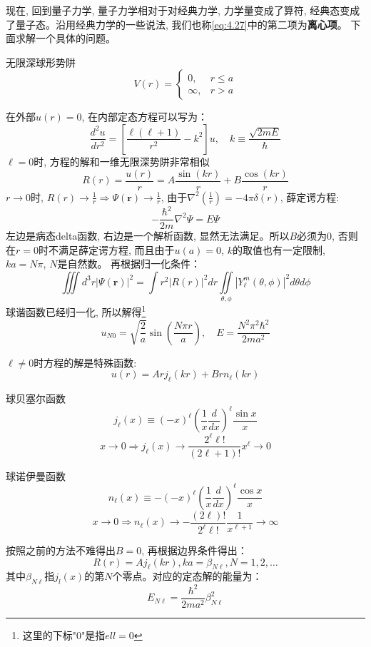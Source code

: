 \documentclass[a4paper,zihao=-4,linespread=1]{ctexrep}
\begin{document}
    现在, 回到量子力学, 量子力学相对于对经典力学, 力学量变成了算符, 经典态变成了量子态。沿用经典力学的一些说法, 我们也称\ref{eq:4.27}中的第二项为\textbf{离心项}。
    下面求解一个具体的问题。
    \begin{define}{无限深球形势阱}
        \begin{equation}
          V(r)=\begin{cases}
            0,&r\leq a\\
            \infty,&r>a
            \end{cases}  
        \end{equation}
    \end{define}
    在外部$u(r)=0$, 在内部定态方程可以写为：
    \begin{equation}
        \frac{d^2u}{dr^2}=\left[\frac{\ell\left(\ell+1\right)}{r^2}-k^2\right]u,\quad k\equiv\frac{\sqrt{2mE}}{\hbar}
    \end{equation}
    $\ell=0$时, 方程的解和一维无限深势阱非常相似
    \[R(r)=\frac{u(r)}{r}=A\frac{\sin(kr)}{r}+B\frac{\cos(kr)}{r}\]
    $r\to0$时, $R(r)\to \frac{1}{r}\Rightarrow \Psi(\bm{r})\to \frac{1}{r}$, 由于$\nabla^2\left(\frac{1}{r}\right)=-4\pi\delta(r)$, 薛定谔方程:
    \[-\frac{\hbar^2}{2m}\nabla^2\Psi=E\Psi\]
    左边是病态delta函数, 右边是一个解析函数, 显然无法满足。所以$B$必须为$0$, 否则在$r=0$时不满足薛定谔方程, 而且由于$u(a)=0$, $k$的取值也有一定限制, $ka=N\pi$, $N$是自然数。
    再根据归一化条件：\[
        \iiint d^3r\left|\Psi(\bm{r})\right|^2=\int r^2\left|R(r)\right|^2dr\iint\limits_{\theta,\phi}\left|Y_\ell^m(\theta,\phi)\right|^2d\theta d\phi\]
    球谐函数已经归一化, 所以解得\footnote{这里的下标"0"是指$ell=0$}
    \begin{equation}
        u_{N0}=\sqrt{\frac{2}{a}}\sin\left(\frac{N\pi r}{a}\right),\quad E=\frac{N^2\pi^2\hbar^2}{2ma^2}
    \end{equation}

    $\ell\neq 0$时方程的解是特殊函数:
    \[u(r)=Arj_\ell(kr)+Brn_\ell(kr)\]
    \begin{define}{球贝塞尔函数}
        \begin{equation}
            j_\ell(x)\equiv(-x)^\ell\left(\frac{1}{x}\frac{d}{dx}\right)^\ell\frac{\sin x}{x}
        \end{equation}
        \[x\to 0\Rightarrow j_\ell(x)\to\frac{2^\ell \ell!}{(2\ell+1)!}x^\ell \to 0\]
    \end{define}
    \begin{define}{球诺伊曼函数}
        \begin{equation}
            n_\ell(x)\equiv-(-x)^\ell\left(\frac{1}{x}\frac{d}{dx}\right)^\ell\frac{\cos x}{x}
        \end{equation}
        \[x\to 0\Rightarrow n_\ell(x)\to-\frac{(2\ell)!}{2^\ell \ell!}\frac{1}{x^{\ell+1}}\to \infty \]
    \end{define}
    按照之前的方法不难得出$B=0$, 再根据边界条件得出：
    \[R(r)=Aj_\ell(kr),ka=\beta_{N\ell},N=1,2,\ldots\]
    其中$\beta_{N\ell}$指$j_l(x)$的第$N$个零点。对应的定态解的能量为：\[E_{N\ell}=\frac{\hbar^2}{2ma^2}\beta_{N\ell}^2\]
    
\end{document}
